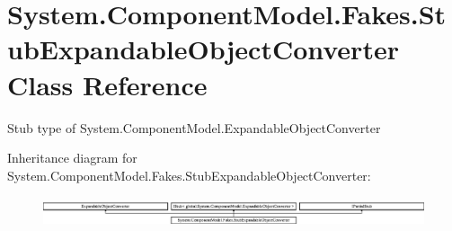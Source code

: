 \hypertarget{class_system_1_1_component_model_1_1_fakes_1_1_stub_expandable_object_converter}{\section{System.\-Component\-Model.\-Fakes.\-Stub\-Expandable\-Object\-Converter Class Reference}
\label{class_system_1_1_component_model_1_1_fakes_1_1_stub_expandable_object_converter}
}


Stub type of System.\-Component\-Model.\-Expandable\-Object\-Converter 


Inheritance diagram for System.\-Component\-Model.\-Fakes.\-Stub\-Expandable\-Object\-Converter\-:\begin{figure}[H]
\begin{center}
\leavevmode
\includegraphics[height=0.897436cm]{class_system_1_1_component_model_1_1_fakes_1_1_stub_expandable_object_converter}
\end{center}
\end{figure}
